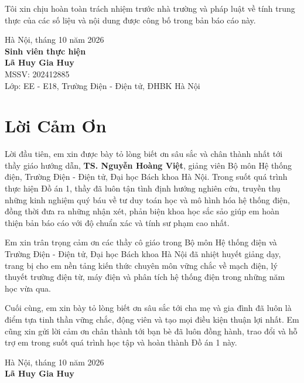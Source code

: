 \documentclass[12pt,a4paper,oneside]{report}
\begin{document}
Tôi xin chịu hoàn toàn trách nhiệm trước nhà trường và pháp luật về tính trung thực của các số liệu và nội dung được công bố trong bản báo cáo này.

\vspace{45pt}
\begin{flushright}
    Hà Nội, tháng 10 năm 2026\\[12pt]
    \textbf{Sinh viên thực hiện}\\[45pt]
    \textbf{Lã Huy Gia Huy}\\
    MSSV: 202412885\\
    Lớp: EE - E18, Trường Điện - Điện tử, ĐHBK Hà Nội
\end{flushright}

\clearpage

\chapter*{Lời Cảm Ơn}

Lời đầu tiên, em xin được bày tỏ lòng biết ơn sâu sắc và chân thành nhất tới thầy giáo hướng dẫn, \textbf{TS. Nguyễn Hoàng Việt}, giảng viên Bộ môn Hệ thống điện, Trường Điện - Điện tử, Đại học Bách khoa Hà Nội. Trong suốt quá trình thực hiện Đồ án 1, thầy đã luôn tận tình định hướng nghiên cứu, truyền thụ những kinh nghiệm quý báu về tư duy toán học và mô hình hóa hệ thống điện, đồng thời đưa ra những nhận xét, phản biện khoa học sắc sảo giúp em hoàn thiện bản báo cáo với độ chuẩn xác và tính sư phạm cao nhất.

Em xin trân trọng cảm ơn các thầy cô giáo trong Bộ môn Hệ thống điện và Trường Điện - Điện tử, Đại học Bách khoa Hà Nội đã nhiệt huyết giảng dạy, trang bị cho em nền tảng kiến thức chuyên môn vững chắc về mạch điện, lý thuyết trường điện từ, máy điện và phân tích hệ thống điện trong những năm học vừa qua.

Cuối cùng, em xin bày tỏ lòng biết ơn sâu sắc tới cha mẹ và gia đình đã luôn là điểm tựa tinh thần vững chắc, động viên và tạo mọi điều kiện thuận lợi nhất. Em cũng xin gửi lời cảm ơn chân thành tới bạn bè đã luôn đồng hành, trao đổi và hỗ trợ em trong suốt quá trình học tập và hoàn thành Đồ án 1 này.

\vspace{45pt}
\begin{flushright}
    Hà Nội, tháng 10 năm 2026\\[12pt]
    \textbf{Lã Huy Gia Huy}
\end{flushright}
\end{document}
